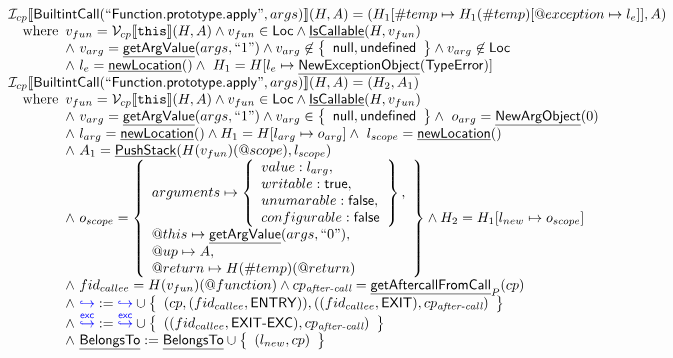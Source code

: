 \documentclass{article}
\makeatletter
\newcommand{\SF}[1]{\mbox{\textsf{#1}}}
\newcommand{\TT}[1]{\mbox{\texttt{#1}}}
\newcommand{\cfgnext}{\hookrightarrow}
\newcommand{\excnext}{\stackrel{\mathsf{exc}}{\hookrightarrow}}
\newcommand{\wherec}[1]{{\rm where}\begin{array}[t]{l}#1\end{array}}
\newcommand{\I}{\mathcal{I}}
\newcommand{\V}{\mathcal{V}}
\newcommand{\set}[1]{\left\{\begin{array}{l}#1\end{array}\right\}}
\newcommand{\lbr}{\llbracket}
\newcommand{\rbr}{\rrbracket}
\newcommand{\hf}[1]{\underline{\sf #1}}
\newcommand{\varloc}[1]{\##1}
\newcommand{\varprop}[1]{@#1}
\def\inblue{\color{blue}}
\def\inblue{\color{blue}}
\makeatother
\begin{document}
\[\begin{array}{l}
\I _{cp}\lbr \SF{BuiltintCall}(``\SF{Function.prototype.apply}",args)\rbr(H,A)
 = (H_1[\varloc{temp}\mapsto H_1(\varloc{temp})[\varprop{exception}\mapsto l_e]], A) \\
\quad\wherec{
  v_{fun} = \V _{cp}\lbr \TT{this}\rbr (H,A) \land v_{fun} \in \SF{Loc} \land \hf{IsCallable}(H,v_{fun})\\
  \land\ v_{arg} = \hf{getArgValue}(args, ``1") \land v_{arg} \not\in \set{\SF{null},\SF{undefined}}
  \land v_{arg} \not\in \SF{Loc}\\
  \land\ l_e = \hf{newLocation}() \land\ H_1=H[l_e\mapsto\hf{NewExceptionObject}(\SF{TypeError})] 
  }\\

\I _{cp}\lbr \SF{BuiltintCall}(``\SF{Function.prototype.apply}",args)\rbr(H,A) = (H_2, A_1)\\
\quad\wherec{
  v_{fun} = \V _{cp}\lbr \TT{this}\rbr (H,A) \land v_{fun} \in \SF{Loc} \land \hf{IsCallable}(H,v_{fun})\\
  \land\ v_{arg} = \hf{getArgValue}(args, ``1") \land v_{arg} \in \set{\SF{null},\SF{undefined}}
  \land\ o_{arg} = \hf{NewArgObject}(0)\\
  \land\ l_{arg} = \hf{newLocation}() \land H_1 = H[l_{arg} \mapsto o_{arg}]
  \land\ l_{scope} = \hf{newLocation}()\\
  \land\ A_1=\hf{PushStack}(H(v_{fun})(\varprop{scope}),l_{scope}) \\
  \land\ o_{scope} = \set{
    arguments \mapsto \set{value : l_{arg},\\ 
      writable : \SF{true},\\ unumarable : \SF{false},\\ configurable : \SF{false}},\\
    \varprop{this} \mapsto \hf{getArgValue}(args, ``0"),\\
    \varprop{up} \mapsto A,\\
    \varprop{return} \mapsto H(\varloc{temp})(\varprop{return})}
  \land H_2 = H_1[l_{new} \mapsto o_{scope}]\\
  \land\ fid_{callee}= H(v_{fun})(\varprop{function})
  \land cp_{\textit{after-call}} = \hf{getAftercallFromCall}_P(cp) \\
  \land\ {\inblue \cfgnext} :=
  {\inblue \cfgnext}\cup\set{( cp,(fid_{callee},\SF{ENTRY})),
    ((fid_{callee},\SF{EXIT}), cp_{\textit{after-call}})}\\
  \land\ {\inblue \excnext}:={\inblue \excnext}
  \cup\set{((fid_{callee},\SF{EXIT-EXC}), cp_{\textit{after-call}})}\\
  \land\ \hf{BelongsTo}:=\hf{BelongsTo}\cup\set{(l_{new},cp)}
  }\\


\end{array}\]
\end{document}
